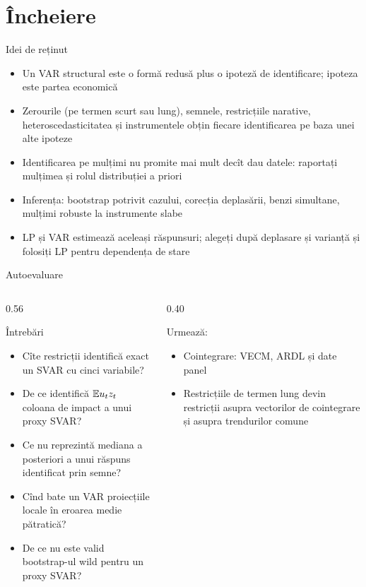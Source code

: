 \section{Încheiere}

\begin{frame}{Idei de reținut}
\itemsize{\small}
\begin{itemize}
    \item Un VAR structural este o formă redusă plus o ipoteză de identificare; ipoteza este partea economică
    \item Zerourile (pe termen scurt sau lung), semnele, restricțiile narative, heteroscedasticitatea și instrumentele obțin fiecare identificarea pe baza unei alte ipoteze
    \item Identificarea pe mulțimi nu promite mai mult decît dau datele: raportați mulțimea și rolul distribuției a priori
    \item Inferența: bootstrap potrivit cazului, corecția deplasării, benzi simultane, mulțimi robuste la instrumente slabe
    \item LP și VAR estimează aceleași răspunsuri; alegeți după deplasare și varianță și folosiți LP pentru dependența de stare
\end{itemize}
\end{frame}

\begin{frame}{Autoevaluare}
\itemsize{\small}
\begin{columns}[T]
\begin{column}{0.56\textwidth}
\begin{block}{Întrebări}
\begin{itemize}
    \item Cîte restricții identifică exact un SVAR cu cinci variabile?
    \item De ce identifică $\mathbb{E} u_tz_t$ coloana de impact a unui proxy SVAR?
    \item Ce nu reprezintă mediana a posteriori a unui răspuns identificat prin semne?
    \item Cînd bate un VAR proiecțiile locale în eroarea medie pătratică?
    \item De ce nu este valid bootstrap-ul wild pentru un proxy SVAR?
\end{itemize}
\end{block}
\end{column}
\begin{column}{0.40\textwidth}
\begin{block}{Urmează: }
\begin{itemize}
    \item Cointegrare: VECM, ARDL și date panel
    \item Restricțiile de termen lung devin restricții asupra vectorilor de cointegrare și asupra trendurilor comune
\end{itemize}
\end{block}
\end{column}
\end{columns}
\end{frame}


